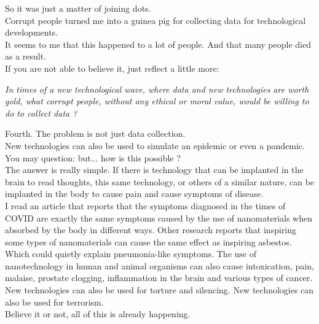 \documentclass[11pt]{book}
\begin{document}
\noindent So it was just a matter of joining dots. \\

\noindent Corrupt people turned me into a guinea pig for collecting data for technological developments. \\

\noindent It seems to me that this happened to a lot of people. And that many people died as a result. \\

\noindent If you are not able to believe it, just reflect a little more:

\noindent \begin{center} \emph{In times of a new technological wave, where data and new technologies are worth gold, what corrupt people, without any ethical or moral value, would be willing to do to collect data ?} \end{center}

\noindent Fourth. The problem is not just data collection. \\

\noindent New technologies can also be used to simulate an epidemic or even a pandemic. \\

\noindent You may question: but... how is this possible ? \\

\noindent The answer is really simple. If there is technology that can be implanted in the brain to read thoughts, this same technology, or others of a similar nature, can be implanted in the body to cause pain and cause symptoms of disease. \\

\noindent I read an article that reports that the symptoms diagnosed in the times of COVID are exactly the same symptoms caused by the use of nanomaterials when absorbed by the body in different ways. Other research reports that inspiring some types of nanomaterials can cause the same effect as inspiring asbestos. Which could quietly explain pneumonia-like symptoms. The use of nanotechnology in human and animal organisms can also cause intoxication, pain, malaise, prostate clogging, inflammation in the brain and various types of cancer. \\

\noindent New technologies can also be used for torture and silencing. New technologies can also be used for terrorism. \\

\noindent Believe it or not, all of this is already happening. \\
\end{document}
